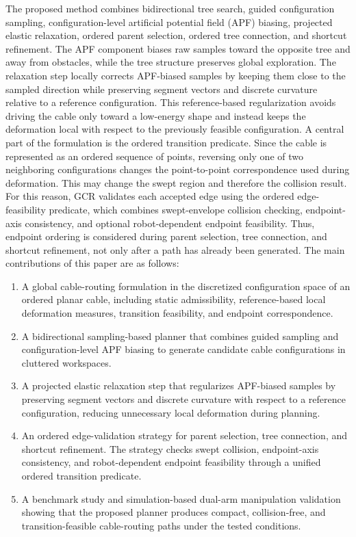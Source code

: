 \documentclass{pas}
\begin{document}
The proposed method combines bidirectional tree search, guided configuration sampling, configuration-level artificial potential field (APF) biasing, projected elastic relaxation, ordered parent selection, ordered tree connection, and shortcut refinement. The APF component biases raw samples toward the opposite tree and away from obstacles, while the tree structure preserves global exploration. The relaxation step locally corrects APF-biased samples by keeping them close to the sampled direction while preserving segment vectors and discrete curvature relative to a reference configuration. This reference-based regularization avoids driving the cable only toward a low-energy shape and instead keeps the deformation local with respect to the previously feasible configuration. A central part of the formulation is the ordered transition predicate. Since the cable is represented as an ordered sequence of points, reversing only one of two neighboring configurations changes the point-to-point correspondence used during deformation. This may change the swept region and therefore the collision result. For this reason, GCR validates each accepted edge using the ordered edge-feasibility predicate, which combines swept-envelope collision checking, endpoint-axis consistency, and optional robot-dependent endpoint feasibility. Thus, endpoint ordering is considered during parent selection, tree connection, and shortcut refinement, not only after a path has already been generated. The main contributions of this paper are as follows:
\begin{enumerate}
    \item A global cable-routing formulation in the discretized configuration space of an ordered planar cable, including static admissibility, reference-based local deformation measures, transition feasibility, and endpoint correspondence.
    \item A bidirectional sampling-based planner that combines guided sampling and configuration-level APF biasing to generate candidate cable configurations in cluttered workspaces.
    \item A projected elastic relaxation step that regularizes APF-biased samples by preserving segment vectors and discrete curvature with respect to a reference configuration, reducing unnecessary local deformation during planning.
    \item An ordered edge-validation strategy for parent selection, tree connection, and shortcut refinement. The strategy checks swept collision, endpoint-axis consistency, and robot-dependent endpoint feasibility through a unified ordered transition predicate.
    \item A benchmark study and simulation-based dual-arm manipulation validation showing that the proposed planner produces compact, collision-free, and transition-feasible cable-routing paths under the tested conditions.
\end{enumerate}
\end{document}

